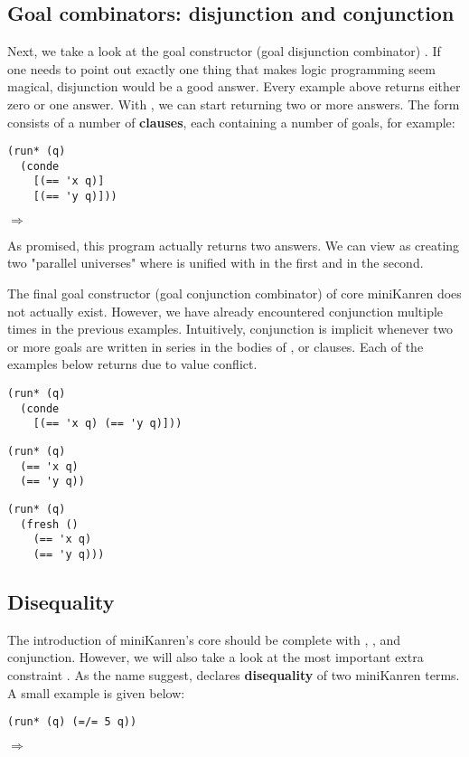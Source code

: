 \subsection{Goal combinators: disjunction and conjunction}
Next, we take a look at the goal constructor (goal disjunction combinator) .
If one needs to point out exactly one thing that makes logic programming seem magical, disjunction would be a good answer. Every example above returns either zero or one answer. With , we can start returning two or more answers. The  form consists of a number of \textbf{clauses}, each containing a number of goals, for example:

\begin{lstlisting}
(run* (q)
  (conde
    [(== 'x q)]
    [(== 'y q)]))
\end{lstlisting}
$\Rightarrow$ 

As promised, this program actually returns two answers. We can view  as creating two "parallel universes" where  is unified with  in the first and  in the second.

The final goal constructor (goal conjunction combinator) of core miniKanren does not actually exist. However, we have already encountered conjunction multiple times in the previous examples. Intuitively, conjunction is implicit whenever two or more goals are written in series in the bodies of ,  or  clauses. Each of the examples below returns \code{()} due to value conflict.
\begin{lstlisting}
(run* (q)
  (conde
    [(== 'x q) (== 'y q)]))
\end{lstlisting}

\begin{lstlisting}
(run* (q)
  (== 'x q)
  (== 'y q))
\end{lstlisting}

\begin{lstlisting}
(run* (q)
  (fresh ()
    (== 'x q)
    (== 'y q)))
\end{lstlisting}

\subsection{Disequality}
The introduction of miniKanren's core should be complete with \code{==}, ,  and conjunction. However, we will also take a look at the most important extra constraint \code{=/=}. As the name suggest, \code{=/=} declares \textbf{disequality} of two miniKanren terms. A small example is given below:
\begin{lstlisting}
(run* (q) (=/= 5 q))
\end{lstlisting}
$\Rightarrow$ 

